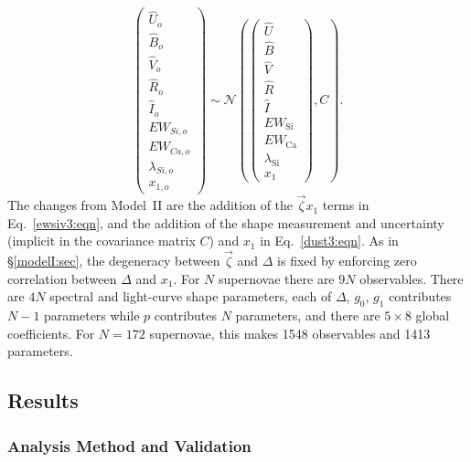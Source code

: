 \documentclass[trackchanges]{aastex62}   	%
\begin{document}
\begin{equation}
\begin{pmatrix}
{\hat{U}}_o\\{\hat{B}}_o\\ {\hat{V}}_o\\{\hat{R}}_o\\{\hat{I}}_o\\EW_{Si, o}\\ EW_{Ca, o} \\ \lambda_{Si, o} \\ x_{1, o}
\end{pmatrix}
\sim \mathcal{N}
\left(
\begin{pmatrix}
{\hat{U}}  \\{\hat{B}}  \\
{\hat{V}}\\{\hat{R}}\\{\hat{I}}\\
EW_{\mathrm{Si}}\\ EW_{\mathrm{Ca}} \\ \lambda_{\mathrm{Si}} \\ x_1
\end{pmatrix}
,C
\right).
\label{dust3:eqn}
\end{equation}
The changes from Model~II are the addition of the $\vec{\zeta} x_1$ terms in Eq.~\ref{ewsiv3:eqn}, and
the addition of the shape measurement and uncertainty (implicit in the covariance matrix $C$) and $x_1$   in Eq.~\ref{dust3:eqn}.
As in \S\ref{modelI:sec}, the degeneracy between $\vec{\zeta}$ and $\Delta$ is fixed by enforcing zero correlation between $\Delta$ and $x_1$.
For $N$ supernovae there are $9N$ observables.  There are $4N$ spectral and light-curve shape parameters, each of
$\Delta$, $g_0$, $g_1$ contributes $N-1$ parameters while $p$  contributes $N$ parameters,  and there are $5 \times 8$ global coefficients.
For $N=172$ supernovae, this makes 1548 observables and 1413  parameters.


\subsection{Results}

\subsubsection{Analysis Method and Validation}
\end{document}
